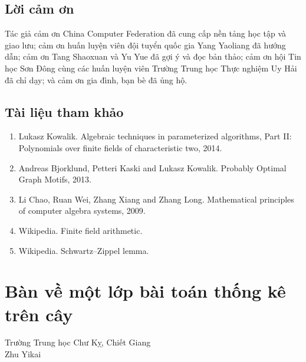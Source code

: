 \documentclass[11pt]{article}
\begin{document}
\subsection{Lời cảm ơn}

Tác giả cảm ơn China Computer Federation đã cung cấp nền tảng học tập và giao
lưu; cảm ơn huấn luyện viên đội tuyển quốc gia Yang Yaoliang đã hướng dẫn; cảm
ơn Tang Shaoxuan và Yu Yue đã gợi ý và đọc bản thảo; cảm ơn hội Tin học Sơn
Đông cùng các huấn luyện viên Trường Trung học Thực nghiệm Uy Hải đã chỉ dạy;
và cảm ơn gia đình, bạn bè đã ủng hộ.

\subsection{Tài liệu tham khảo}

\begin{enumerate}
  \item Lukasz Kowalik. Algebraic techniques in parameterized algorithms, Part
  II: Polynomials over finite fields of characteristic two, 2014.
  \item Andreas Bjorklund, Petteri Kaski and Lukasz Kowalik. Probably Optimal
  Graph Motifs, 2013.
  \item Li Chao, Ruan Wei, Zhang Xiang and Zhang Long. Mathematical principles
  of computer algebra systems, 2009.
  \item Wikipedia. Finite field arithmetic.
  \item Wikipedia. Schwartz--Zippel lemma.
\end{enumerate}

\section{Bàn về một lớp bài toán thống kê trên cây}

\begin{center}
Trường Trung học Chư Kỵ, Chiết Giang\\
Zhu Yikai
\end{center}

\renewcommand{\abstractname}{Tóm tắt}
\begin{abstract}
Bài viết xuất phát từ một bài tập do tác giả ra cho đội tuyển quốc gia Trung
Quốc IOI 2023, từ đó dẫn ra một lớp bài toán thống kê trên cây. Tác giả giới
thiệu một thuật toán có tính tổng quát nhất định cho lớp bài toán này, rồi đưa
ra vài bài ví dụ và lần lượt dùng thuật toán đó để giải.
\end{abstract}
\end{document}

